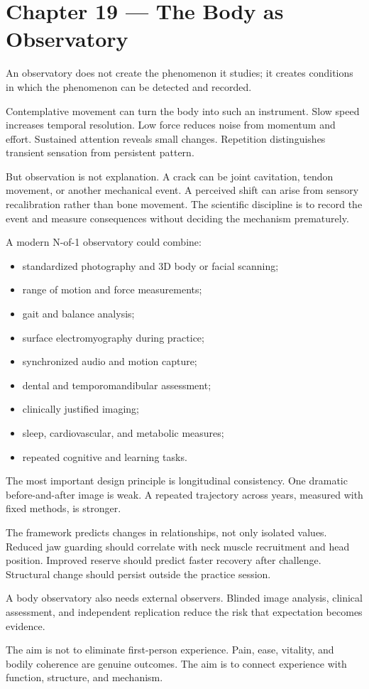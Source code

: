 \chapter{Chapter 19 --- The Body as Observatory}\label{chapter-19-the-body-as-observatory}

An observatory does not create the phenomenon it studies; it creates conditions in which the phenomenon can be detected and recorded.

Contemplative movement can turn the body into such an instrument. Slow speed increases temporal resolution. Low force reduces noise from momentum and effort. Sustained attention reveals small changes. Repetition distinguishes transient sensation from persistent pattern.

But observation is not explanation. A crack can be joint cavitation, tendon movement, or another mechanical event. A perceived shift can arise from sensory recalibration rather than bone movement. The scientific discipline is to record the event and measure consequences without deciding the mechanism prematurely.

A modern N-of-1 observatory could combine:

\begin{itemize}
\tightlist
\item
  standardized photography and 3D body or facial scanning;
\item
  range of motion and force measurements;
\item
  gait and balance analysis;
\item
  surface electromyography during practice;
\item
  synchronized audio and motion capture;
\item
  dental and temporomandibular assessment;
\item
  clinically justified imaging;
\item
  sleep, cardiovascular, and metabolic measures;
\item
  repeated cognitive and learning tasks.
\end{itemize}

The most important design principle is longitudinal consistency. One dramatic before-and-after image is weak. A repeated trajectory across years, measured with fixed methods, is stronger.

The framework predicts changes in relationships, not only isolated values. Reduced jaw guarding should correlate with neck muscle recruitment and head position. Improved reserve should predict faster recovery after challenge. Structural change should persist outside the practice session.

A body observatory also needs external observers. Blinded image analysis, clinical assessment, and independent replication reduce the risk that expectation becomes evidence.

The aim is not to eliminate first-person experience. Pain, ease, vitality, and bodily coherence are genuine outcomes. The aim is to connect experience with function, structure, and mechanism.
